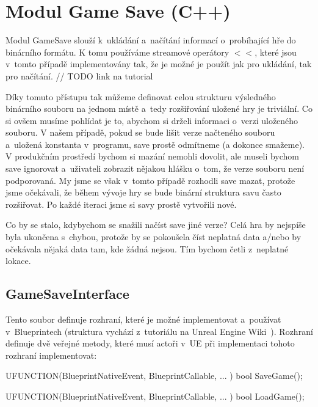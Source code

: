 
\section{Modul Game Save (C++)}

Modul GameSave slouží k~ukládání a~načítání informací o~probíhající hře do binárního formátu. K tomu používáme streamové operátory $<<$, které jsou v~tomto případě implementovány tak, že je možné je použít jak pro ukládání, tak pro načítání. // TODO link na tutorial

Díky tomuto přístupu tak můžeme definovat celou strukturu výsledného binárního souboru na jednom místě a~tedy rozšiřování uložené hry je triviální. Co si ovšem musíme pohlídat je to, abychom si drželi informaci o~verzi uloženého souboru. V našem případě, pokud se bude lišit verze načteného souboru a~uložená konstanta v~programu, save prostě odmítneme (a dokonce smažeme). V produkčním prostředí bychom si mazání nemohli dovolit, ale museli bychom save ignorovat a~uživateli zobrazit nějakou hlášku o~tom, že verze souboru není podporovaná. My jsme se však v~tomto případě rozhodli save mazat, protože jsme očekávali, že během vývoje hry se bude binární struktura savu často rozšiřovat. Po každé iteraci jsme si savy prostě vytvořili nové.

Co by se stalo, kdybychom se snažili načíst save jiné verze? Celá hra by nejspíše byla ukončena s~chybou, protože by se pokoušela číst neplatná data a/nebo by očekávala nějaká data tam, kde žádná nejsou. Tím bychom četli z~neplatné lokace.




\subsection{GameSaveInterface}

Tento soubor definuje rozhraní, které je možné implementovat a~používat v~Blueprintech (struktura vychází z~tutoriálu na Unreal Engine Wiki~\citep{ue_interfaces_tut}). Rozhraní definuje dvě veřejné metody, které musí actoři v~UE při implementaci tohoto rozhraní implementovat:

\begin{code}
UFUNCTION(BlueprintNativeEvent, BlueprintCallable, ... )
	bool SaveGame();

UFUNCTION(BlueprintNativeEvent, BlueprintCallable, ... )
	bool LoadGame();
\end{code}


